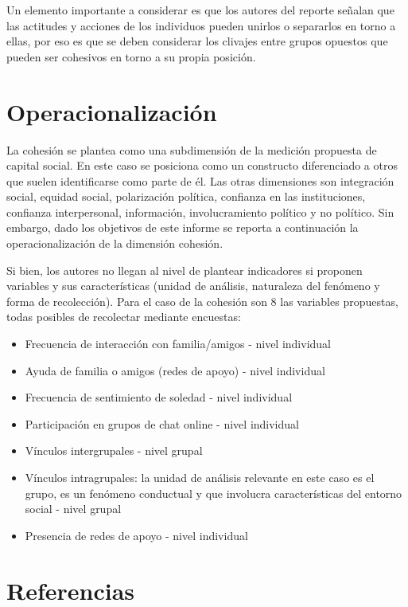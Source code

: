 \documentclass[
  12pt,
]{book}
\begin{document}
Un elemento importante a considerar es que los autores del reporte señalan que las actitudes y acciones de los individuos pueden unirlos o separarlos en torno a ellas, por eso es que se deben considerar los clivajes entre grupos opuestos que pueden ser cohesivos en torno a su propia
posición.

\hypertarget{operacionalizaciuxf3n-3}{%
\section{Operacionalización}\label{operacionalizaciuxf3n-3}}

La cohesión se plantea como una subdimensión de la medición propuesta de capital social. En este caso se posiciona como un constructo diferenciado a otros que suelen identificarse como parte de él. Las otras dimensiones son integración social, equidad social, polarización política, confianza en las instituciones, confianza interpersonal, información, involucramiento político y no político. Sin embargo, dado los objetivos de este informe se reporta a continuación la operacionalización de la dimensión cohesión.

Si bien, los autores no llegan al nivel de plantear indicadores si proponen variables y sus características (unidad de análisis, naturaleza del fenómeno y forma de recolección). Para el caso de la cohesión son 8 las variables propuestas, todas posibles de recolectar mediante
encuestas:

\begin{itemize}
\item
  Frecuencia de interacción con familia/amigos - nivel individual
\item
  Ayuda de familia o amigos (redes de apoyo) - nivel individual
\item
  Frecuencia de sentimiento de soledad - nivel individual
\item
  Participación en grupos de chat online - nivel individual
\item
  Vínculos intergrupales - nivel grupal
\item
  Vínculos intragrupales: la unidad de análisis relevante en este caso
  es el grupo, es un fenómeno conductual y que involucra
  características del entorno social - nivel grupal
\item
  Presencia de redes de apoyo - nivel individual
\end{itemize}

\hypertarget{referencias-3}{%
\section{Referencias}\label{referencias-3}}
\end{document}
